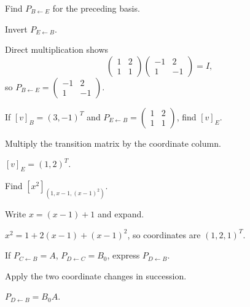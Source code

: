 \begin{exercise}\label{exr:i04-expand-02}
Find \(P_{B\leftarrow E}\) for the preceding basis.
\end{exercise}
\begin{hint}
Invert \(P_{E\leftarrow B}\).
\end{hint}
\begin{solution}
Direct multiplication shows
\[
\begin{pmatrix}1&2\\1&1\end{pmatrix}
\begin{pmatrix}-1&2\\1&-1\end{pmatrix}=I,
\]
so \(P_{B\leftarrow E}=\begin{pmatrix}-1&2\\1&-1\end{pmatrix}\).
\end{solution}

\begin{exercise}\label{exr:i04-expand-03}
If \([v]_B=(3,-1)^T\) and \(P_{E\leftarrow B}=\begin{pmatrix}1&2\\1&1\end{pmatrix}\), find \([v]_E\).
\end{exercise}
\begin{hint}
Multiply the transition matrix by the coordinate column.
\end{hint}
\begin{solution}
\([v]_E=(1,2)^T\).
\end{solution}

\begin{exercise}\label{exr:i04-expand-04}
Find \([x^2]_{(1,x-1,(x-1)^2)}\).
\end{exercise}
\begin{hint}
Write \(x=(x-1)+1\) and expand.
\end{hint}
\begin{solution}
\(x^2=1+2(x-1)+(x-1)^2\), so coordinates are \((1,2,1)^T\).
\end{solution}

\begin{exercise}[Cocycle]\label{exr:i04-expand-05}
If \(P_{C\leftarrow B}=A\), \(P_{D\leftarrow C}=B_0\), express \(P_{D\leftarrow B}\).
\end{exercise}
\begin{hint}
Apply the two coordinate changes in succession.
\end{hint}
\begin{solution}
\(P_{D\leftarrow B}=B_0A\).
\end{solution}

